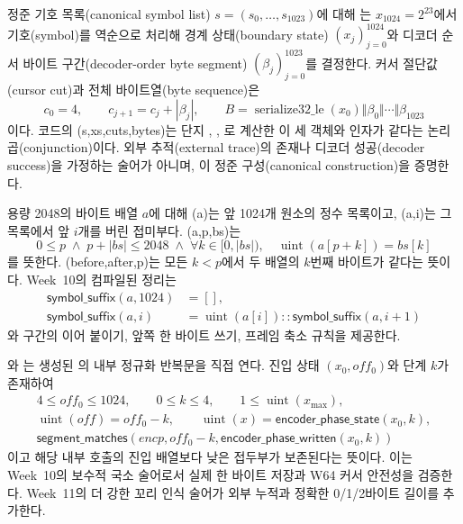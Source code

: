 \begin{definition}
\label{def:rans-byte-trace}
정준 기호 목록(canonical symbol list) \(s=(s_0,\ldots,s_{1023})\)에 대해
는 \(x_{1024}=2^{23}\)에서 기호(symbol)를 역순으로
처리해 경계 상태(boundary state) \((x_j)_{j=0}^{1024}\)와 디코더 순서 바이트
구간(decoder-order byte segment) \((\beta_j)_{j=0}^{1023}\)를 결정한다. 커서
절단값(cursor cut)과 전체 바이트열(byte sequence)은
\[
  c_0=4,\qquad c_{j+1}=c_j+|\beta_j|,
  \qquad
  B=\operatorname{serialize32\_le}(x_0)
      \Vert\beta_0\Vert\cdots\Vert\beta_{1023}
\]
이다. 코드의 (s,xs,cuts,bytes)는 단지
, , 로
계산한 이 세 객체와 인자가 같다는 논리곱(conjunction)이다. 외부 추적(external
trace)의 존재나 디코더 성공(decoder success)을 가정하는 술어가 아니며,
이 정준 구성(canonical construction)을
증명한다.
\end{definition}

\begin{definition}
\label{def:rans-array-list-bridge}
용량 2048의 바이트 배열 \(a\)에 대해
(a)는 앞 1024개 원소의 정수 목록이고,
(a,i)는 그 목록에서 앞 \(i\)개를 버린 접미부다.
(a,p,bs)는
\[
  0\le p\;\land\;p+|bs|\le2048\;\land\;
  \forall k\in[0,|bs|),\quad
  \operatorname{uint}(a[p+k])=bs[k]
\]
를 뜻한다. (before,after,p)는 모든 \(k<p\)에서 두
배열의 \(k\)번째 바이트가 같다는 뜻이다. Week~10의 컴파일된 정리는
\[
\begin{aligned}
  \mathsf{symbol\_suffix}(a,1024)&=[],\\
  \mathsf{symbol\_suffix}(a,i)
    &=\operatorname{uint}(a[i])::\mathsf{symbol\_suffix}(a,i+1)
\end{aligned}
\]
와 구간의 이어 붙이기, 앞쪽 한 바이트 쓰기, 프레임 축소 규칙을 제공한다.
\end{definition}

\begin{definition}
\label{def:rans-actual-inner}
와
는 생성된
의 내부 정규화 반복문을 직접 연다. 진입 상태
\((x_0,off_0)\)와 단계 \(k\)가 존재하여
\[
\begin{gathered}
  4\le off_0\le1024,\qquad 0\le k\le4,
  \qquad 1\le\operatorname{uint}(x_{\max}),\\
  \operatorname{uint}(off)=off_0-k,\qquad
  \operatorname{uint}(x)=\mathsf{encoder\_phase\_state}(x_0,k),\\
  \mathsf{segment\_matches}
    (encp,off_0-k,\mathsf{encoder\_phase\_written}(x_0,k))
\end{gathered}
\]
이고 해당 내부 호출의 진입 배열보다 낮은 접두부가 보존된다는 뜻이다. 이는
Week~10의 보수적 국소 술어로서 실제 한 바이트 저장과 W64 커서 안전성을
검증한다. Week~11의 더 강한 꼬리 인식 술어가 외부 누적과 정확한 0/1/2바이트
길이를 추가한다.
\end{definition}

